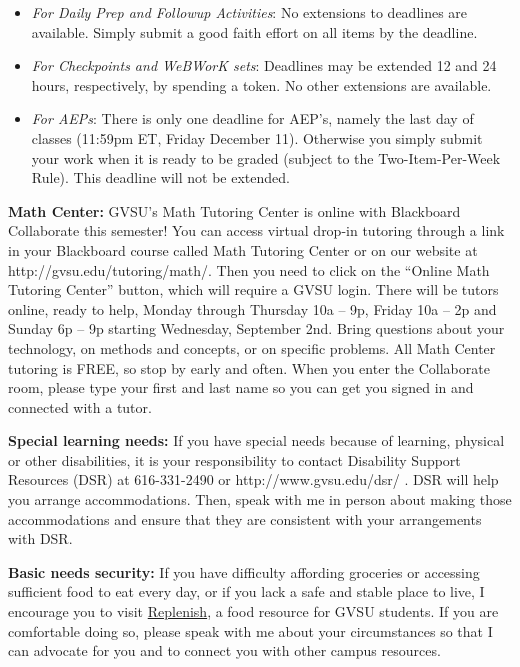 \documentclass[]{article}
\providecommand{\tightlist}{%
  \setlength{\itemsep}{0pt}\setlength{\parskip}{0pt}}
\begin{document}
\begin{itemize}
\tightlist
\item
  \emph{For Daily Prep and Followup Activities}: No extensions to
  deadlines are available. Simply submit a good faith effort on all
  items by the deadline.
\item
  \emph{For Checkpoints and WeBWorK sets}: Deadlines may be extended 12
  and 24 hours, respectively, by spending a token. No other extensions
  are available.
\item
  \emph{For AEPs}: There is only one deadline for AEP's, namely the last
  day of classes (11:59pm ET, Friday December 11). Otherwise you simply
  submit your work when it is ready to be graded (subject to the
  Two-Item-Per-Week Rule). This deadline will not be extended.
\end{itemize}

\textbf{Math Center:} GVSU's Math Tutoring Center is online with
Blackboard Collaborate this semester! You can access virtual drop-in
tutoring through a link in your Blackboard course called Math Tutoring
Center or on our website at http://gvsu.edu/tutoring/math/. Then you
need to click on the ``Online Math Tutoring Center'' button, which will
require a GVSU login. There will be tutors online, ready to help, Monday
through Thursday 10a -- 9p, Friday 10a -- 2p and Sunday 6p -- 9p
starting Wednesday, September 2nd. Bring questions about your
technology, on methods and concepts, or on specific problems. All Math
Center tutoring is FREE, so stop by early and often. When you enter the
Collaborate room, please type your first and last name so you can get
you signed in and connected with a tutor.

\textbf{Special learning needs:} If you have special needs because of
learning, physical or other disabilities, it is your responsibility to
contact Disability Support Resources (DSR) at 616-331-2490 or
http://www.gvsu.edu/dsr/ . DSR will help you arrange accommodations.
Then, speak with me in person about making those accommodations and
ensure that they are consistent with your arrangements with DSR.

\textbf{Basic needs security:} If you have difficulty affording
groceries or accessing sufficient food to eat every day, or if you lack
a safe and stable place to live, I encourage you to visit
\href{https://www.gvsu.edu/replenish/}{Replenish}, a food resource for
GVSU students. If you are comfortable doing so, please speak with me
about your circumstances so that I can advocate for you and to connect
you with other campus resources.
\end{document}
